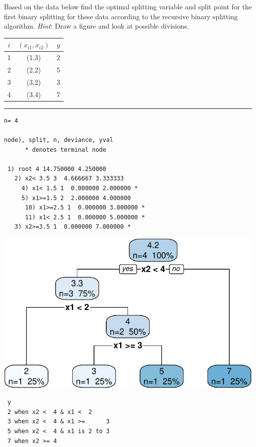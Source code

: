 \documentclass[
  letterpaper,
  DIV=11,
  numbers=noendperiod]{scrartcl}
\begin{document}
Based on the data below find the optimal splitting variable and split
point for the first binary splitting for these data according to the
recursive binary splitting algorithm. \emph{Hint}: Draw a figure and
look at possible divisions.

\begin{longtable}[]{@{}ccc@{}}
\toprule()
\(i\) & \((x_{i1},x_{i2})\) & \(y\) \\
\midrule()
\endhead
1 & (1,3) & 2 \\
2 & (2,2) & 5 \\
3 & (3,2) & 3 \\
4 & (3,4) & 7 \\
\bottomrule()
\end{longtable}

\begin{center}\rule{0.5\linewidth}{0.5pt}\end{center}

\begin{verbatim}
n= 4 

node), split, n, deviance, yval
      * denotes terminal node

 1) root 4 14.750000 4.250000  
   2) x2< 3.5 3  4.666667 3.333333  
     4) x1< 1.5 1  0.000000 2.000000 *
     5) x1>=1.5 2  2.000000 4.000000  
      10) x1>=2.5 1  0.000000 3.000000 *
      11) x1< 2.5 1  0.000000 5.000000 *
   3) x2>=3.5 1  0.000000 7.000000 *
\end{verbatim}

\includegraphics{L13_files/figure-pdf/unnamed-chunk-4-1.pdf}

\begin{verbatim}
 y                            
 2 when x2 <  4 & x1 <  2     
 3 when x2 <  4 & x1 >=      3
 5 when x2 <  4 & x1 is 2 to 3
 7 when x2 >= 4               
\end{verbatim}
\end{document}
